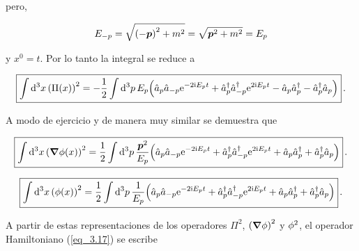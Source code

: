pero, 

\begin{equation*}
    E_{-p} = \sqrt{\qty(-\vb*{p})^2+m^2} = \sqrt{\vb*{p}^2+m^2} = E_p
\end{equation*}

y $x^0 = t$. Por lo tanto la integral se reduce a 

\begin{equation}
    \boxed{
    \int \dd[3]{x} \qty(\Pi(x))^2 = -\frac{1}{2} \int \dd[3]{p}  E_p \qty( \hat{a}_p \hat{a}_{-p}  \mathrm{e}^{-2\mathrm{i} E_p t} + \hat{a}^{\dag}_p \hat{a}^{\dag}_{-p} \mathrm{e}^{ 2\mathrm{i} E_p t} - \hat{a}_p \hat{a}^{\dag}_{p} - \hat{a}^{\dag}_p\hat{a}_{p})
    } \, .
    \label{eq_3.51}
\end{equation}

A modo de ejercicio y de manera muy similar se demuestra que 

\begin{equation}
    \boxed{
    \int \dd[3]{x} \qty(\grad \phi(x))^2 = \frac{1}{2} \int \dd[3]{p} \frac{\vb*{p}^2}{E_p} \qty( \hat{a}_p \hat{a}_{-p}  \mathrm{e}^{-2\mathrm{i} E_p t} + \hat{a}^{\dag}_p \hat{a}^{\dag}_{-p} \mathrm{e}^{ 2\mathrm{i} E_p t} + \hat{a}_p \hat{a}^{\dag}_{p} + \hat{a}^{\dag}_p\hat{a}_{p})
    } \, .
    \label{eq_3.52}
\end{equation}

\begin{equation}
    \boxed{
    \int \dd[3]{x} \qty(\phi(x))^2 = \frac{1}{2} \int \dd[3]{p}  \frac{1}{E_p} \qty( \hat{a}_p \hat{a}_{-p}  \mathrm{e}^{-2\mathrm{i} E_p t} + \hat{a}^{\dag}_p \hat{a}^{\dag}_{-p} \mathrm{e}^{ 2\mathrm{i} E_p t} + \hat{a}_p \hat{a}^{\dag}_{p} + \hat{a}^{\dag}_p \hat{a}_{p})
    } \, .
    \label{eq_3.53}
\end{equation}

A partir de estas representaciones de los operadores $\Pi^2$, $\qty(\grad \phi)^2$ y $\phi^2$, el operador Hamiltoniano (\ref{eq_3.17}) se escribe

